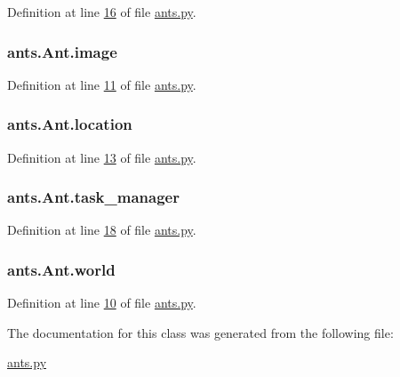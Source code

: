 Definition at line \hyperlink{ants_8py_source_l00016}{16} of file \hyperlink{ants_8py_source}{ants.\+py}.

\hypertarget{classants_1_1Ant_adf5f970b6b5e8472f42275114eeac779}{
\subsubsection[{image}]{\setlength{\rightskip}{0pt plus 5cm}ants.\+Ant.\+image}}\label{classants_1_1Ant_adf5f970b6b5e8472f42275114eeac779}


Definition at line \hyperlink{ants_8py_source_l00011}{11} of file \hyperlink{ants_8py_source}{ants.\+py}.

\hypertarget{classants_1_1Ant_ae7de139b6f5bdb8d4ab42755c405ef5d}{
\subsubsection[{location}]{\setlength{\rightskip}{0pt plus 5cm}ants.\+Ant.\+location}}\label{classants_1_1Ant_ae7de139b6f5bdb8d4ab42755c405ef5d}


Definition at line \hyperlink{ants_8py_source_l00013}{13} of file \hyperlink{ants_8py_source}{ants.\+py}.

\hypertarget{classants_1_1Ant_a80e2218dcfabbd9ef4d83638dd20d943}{
\subsubsection[{task\+\_\+manager}]{\setlength{\rightskip}{0pt plus 5cm}ants.\+Ant.\+task\+\_\+manager}}\label{classants_1_1Ant_a80e2218dcfabbd9ef4d83638dd20d943}


Definition at line \hyperlink{ants_8py_source_l00018}{18} of file \hyperlink{ants_8py_source}{ants.\+py}.

\hypertarget{classants_1_1Ant_a55f64c7cafb3806bdcfda42586adbff5}{
\subsubsection[{world}]{\setlength{\rightskip}{0pt plus 5cm}ants.\+Ant.\+world}}\label{classants_1_1Ant_a55f64c7cafb3806bdcfda42586adbff5}


Definition at line \hyperlink{ants_8py_source_l00010}{10} of file \hyperlink{ants_8py_source}{ants.\+py}.



The documentation for this class was generated from the following file\+:\begin{DoxyCompactItemize}
\item 
\hyperlink{ants_8py}{ants.\+py}\end{DoxyCompactItemize}
